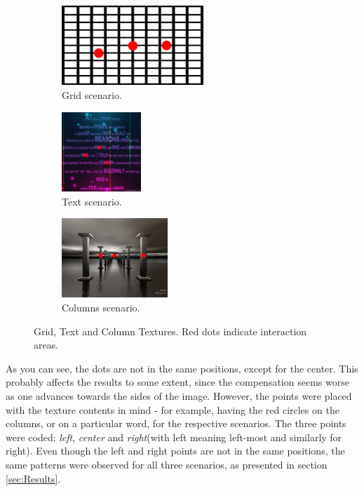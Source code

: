 \documentclass[]{article}
\begin{document}
\begin{figure}[!hbtp]
\centering
\begin{subfigure}{.33\textwidth}
  \centering
  \includegraphics[width=0.9\linewidth, height=3cm]{figures/grid_hd_allPoints.jpg}
  \caption{Grid scenario.}
  \label{fig:GridTexture}
\end{subfigure}%
\begin{subfigure}{.33\textwidth}
  \centering
  \includegraphics[width=0.9\linewidth, height=3cm]{figures/random-text-2048x2048_complete.jpg}
  \caption{Text scenario.}
  \label{fig:TextTexture}
\end{subfigure}
\begin{subfigure}{.33\textwidth}
  \centering
  \includegraphics[width=0.9\linewidth, height=3cm]{figures/3D_Scene_011_allPoints.jpg}
  \caption{Columns scenario.}
  \label{fig:ColumnsTexture}
\end{subfigure}
\caption{Grid, Text and Column Textures. Red dots indicate interaction areas.}
\label{fig:GridTextColumns}
\end{figure}

As you can see, the dots are not in the same positions, except for the center. This probably affects the results to some extent, since the compensation seems worse as one advances towards the sides of the image. However, the points were placed with the texture contents in mind - for example, having the red circles on the columns, or on a particular word, for the respective scenarios. The three points were coded: \textit{left}, \textit{center} and \textit{right}(with left meaning left-most and similarly for right). Even though the left and right points are not in the same positions, the same patterns were observed for all three scenarios, as presented in section \ref{sec:Results}.
\end{document}
